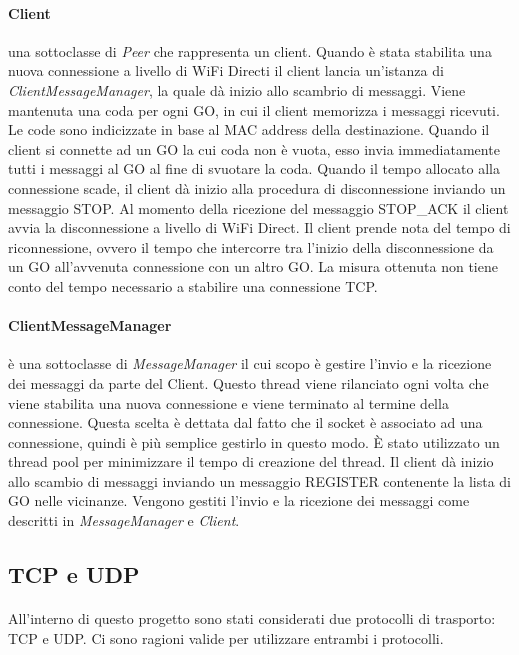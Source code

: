 \documentclass{llncs}
\begin{document}
\paragraph{Client} una sottoclasse di \emph{Peer} che rappresenta un client. Quando è stata stabilita una nuova connessione a livello di WiFi Directi il client lancia un'istanza di \emph{ClientMessageManager}, la quale dà inizio allo 
scambrio di messaggi. Viene mantenuta una coda per ogni GO, 
in cui il client memorizza i messaggi ricevuti. Le code sono indicizzate in base al MAC address della destinazione. Quando il client si connette ad un GO la cui coda non è vuota, esso invia immediatamente tutti i messaggi al GO al 
fine di svuotare la coda. Quando il tempo allocato alla connessione scade, il client dà inizio alla procedura di disconnessione inviando un messaggio STOP. Al momento della ricezione del messaggio STOP\_ACK il client avvia 
la disconnessione a livello di WiFi Direct. Il client prende nota del tempo di riconnessione, ovvero il tempo che intercorre tra l'inizio della disconnessione da un GO all'avvenuta connessione con un altro GO. La misura ottenuta non 
tiene conto del tempo necessario a stabilire una connessione TCP.

\paragraph{ClientMessageManager} è una sottoclasse di \emph{MessageManager} il cui scopo è gestire l'invio e la ricezione dei messaggi da parte del Client. Questo thread viene rilanciato ogni volta che viene stabilita una nuova 
connessione e viene terminato al termine della connessione. Questa scelta è dettata dal fatto che il socket è associato ad una connessione, quindi è più semplice gestirlo in questo modo. È stato utilizzato un thread pool per minimizzare 
il tempo di creazione del thread. Il client dà inizio allo scambio di messaggi inviando un messaggio REGISTER contenente la lista di GO nelle vicinanze. Vengono gestiti l'invio e la ricezione dei messaggi come descritti in 
\emph{MessageManager} e \emph{Client}.

\subsection{TCP e UDP}
\paragraph{} All'interno di questo progetto sono stati considerati due protocolli di trasporto: TCP e UDP. Ci sono ragioni valide per utilizzare entrambi i protocolli.
\end{document}
